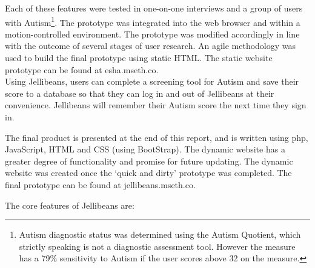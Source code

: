 \documentclass[a4paper, 11pt]{article}
\begin{document}
\vspace{5mm}
Each of these features were tested in one-on-one interviews and a group of users with Autism\footnote{Autism diagnostic status was determined using the Autism Quotient, which strictly speaking is not a diagnostic assessment tool. However the measure has a 79\% sensitivity to Autism if the user scores above 32 on the measure.}. The prototype was integrated into the web browser and within a motion-controlled environment. The prototype was modified accordingly in line with the outcome of several stages of user research. An agile methodology was used to build the final prototype using static HTML. The static website prototype can be found at esha.mseth.co. \\

\vspace{5mm}
Using Jellibeans, users can complete a screening tool for Autism and save their score to a database so that they can log in and out of Jellibeans at their convenience. Jellibeans will remember their Autism score the next time they sign in.

\vspace{5mm}
The final product is presented at the end of this report, and is written using php, JavaScript, HTML and CSS (using BootStrap). The dynamic website has a greater degree of functionality and promise for future updating. The dynamic website was created once the `quick and dirty' prototype was completed. The final prototype can be found at jellibeans.mseth.co.

\vspace{5mm}
The core features of Jellibeans are:
\end{document}
